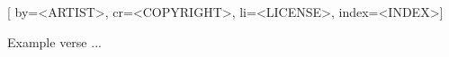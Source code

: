 
[%
    by={<ARTIST>},
    cr={<COPYRIGHT>},
    li={<LICENSE>},
    index={<INDEX>}]


    \label{<INDEX>}

    \beginverse
        Example verse ...
    \endverse
\endsong
